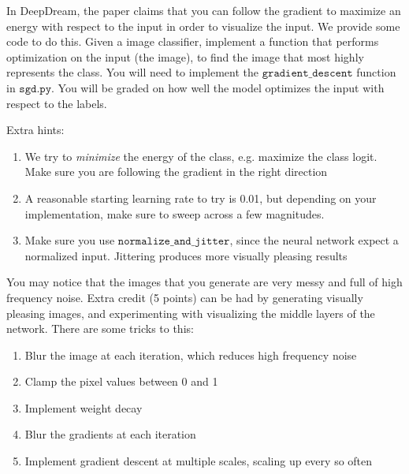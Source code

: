 \documentclass{article}
\begin{document}
In DeepDream, the paper claims that you can follow the gradient to maximize an energy with respect to the input in order to visualize the input.
We provide some code to do this.
Given a image classifier, implement a function that performs optimization on the input (the image), to find the image that most highly represents the class.
You will need to implement the $\texttt{gradient\_descent}$ function in $\texttt{sgd.py}$.
You will be graded on how well the model optimizes the input with respect to the labels.

Extra hints:
\begin{enumerate}
   	\item We try to \emph{minimize} the energy of the class, e.g. maximize the class logit. Make sure you are following the gradient in the right direction
   	\item A reasonable starting learning rate to try is 0.01, but depending on your implementation, make sure to sweep across a few magnitudes.
   	\item Make sure you use $\texttt{normalize\_and\_jitter}$, since the neural network expect a normalized input. Jittering produces more visually pleasing results
\end{enumerate}

You may notice that the images that you generate are very messy and full of high frequency noise.
Extra credit (5 points) can be had by generating visually pleasing images, and experimenting with visualizing the middle layers of the network.
There are some tricks to this:
\begin{enumerate}
	\item Blur the image at each iteration, which reduces high frequency noise
	\item Clamp the pixel values between 0 and 1
	\item Implement weight decay
	\item Blur the gradients at each iteration
	\item Implement gradient descent at multiple scales, scaling up every so often
\end{enumerate}
\end{document}
